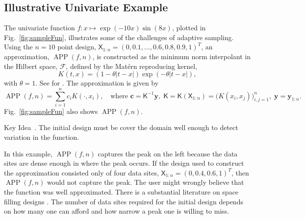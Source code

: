 \documentclass[11pt]{NSFamsart}
\newcommand{\mK}{\mathsf{K}}
\newcommand{\mX}{\mathsf{X}}
\DeclareMathOperator{\APP}{APP}
\newcommand{\bc}{{\boldsymbol{c}}}
\newcommand{\by}{{\boldsymbol{y}}}
\newcommand{\calf}{{\mathcal{F}}}
\def\abs#1{\ensuremath{\left \lvert #1 \right \rvert}}
\newcounter{keyideabean}[section]
\newenvironment{keyidea}{\refstepcounter{keyideabean}\par\bigskip
   \noindent\begin{itshape}%
   Key Idea~\thekeyideabean.\ignorespaces}%
   {\end{itshape}\ignorespacesafterend}
\begin{document}
\subsection{Illustrative Univariate Example} 
The univariate function $f: x \mapsto \exp(-10x) \sin(8x)$, plotted in Fig.\ \ref{fig:sampleFun}, illustrates some of the challenges of adaptive sampling.  Using the $n=10$ point design, $\mX_{1:n} = (0, 0.1, \ldots, 0.6, 0.8, 0.9, 1)^T$, an approximation, $\APP(f,n)$, is constructed as the minimum norm interpolant in the Hilbert space, $\calf$, defined by the Mat\'ern reproducing kernel,
\begin{equation}
    K(t,x) = (1 - \theta \abs{t-x}) \exp(-\theta\abs{t-x}),
\end{equation}
with $\theta = 1$.  See \cite{} for .  The approximation is given by
\begin{equation} \label{appxExOne}
    \APP(f,n) = \sum_{i=1}^n c_i K(\cdot, x_i), \quad \text{where } \bc = \mK^{-1} \by, \; \mK = \mK(\mX_{1:n}) = \bigl( K(x_i,x_j) \bigr)_{i,j=1}^n, \; \by = \by_{1:n}.
\end{equation}
Fig.\ \ref{fig:sampleFun} also shows $\APP(f,n)$.  

\begin{keyidea} \label{keyideainitial}
The initial design must be cover the domain well enough to detect variation in the function.
\end{keyidea}
In this example, $\APP(f,n)$ captures the peak on the left because the data sites are dense enough in where the peak occurs.  If the design used to construct the approximation consisted only of four data sites, $\mX_{1:n} = (0, 0.4,  0.6, 1)^T$, then $\APP(f,n)$ would not capture the peak.  The user might wrongly believe that the function was well approximated.  There is a substantial literature on space filling designs \cite{}. The number of data sites required for the initial design depends on how many one can afford and how narrow a peak one is willing to miss.
\end{document}
